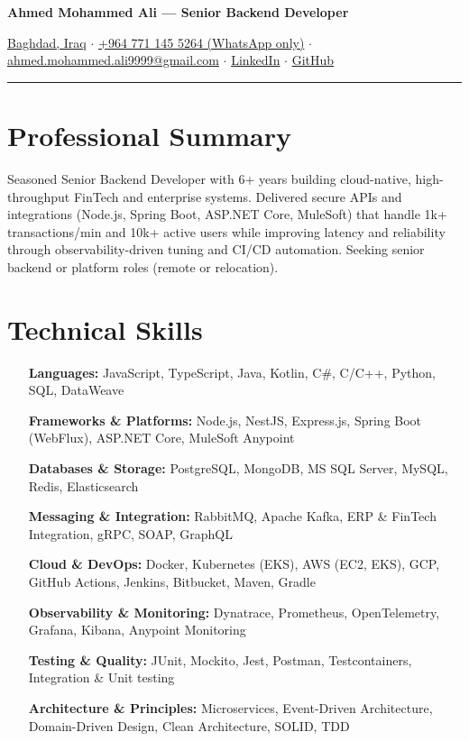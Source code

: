 \documentclass[10pt, a4paper]{article}
\begin{document}
\begin{center}
    \textbf{\Large Ahmed Mohammed Ali — Senior Backend Developer}
\end{center}

\vspace{-1.5mm}
\begin{center}
    \small
    \href{https://maps.app.goo.gl/YourLocation}{Baghdad, Iraq}
    $\cdot$ \href{https://wa.me/9647711455264}{+964 771 145 5264 (WhatsApp only)}
    $\cdot$ \href{mailto:ahmed.mohammed.ali9999@gmail.com}{ahmed.mohammed.ali9999@gmail.com}
    $\cdot$ \href{https://linkedin.com/in/deadboyccc}{LinkedIn}
    $\cdot$ \href{https://github.com/deadboyccc}{GitHub}
\end{center}
\hrule %

\section*{Professional Summary}
Seasoned Senior Backend Developer with 6+ years building cloud-native, high-throughput FinTech and enterprise systems. Delivered secure APIs and integrations (Node.js, Spring Boot, ASP.NET Core, MuleSoft) that handle 1k+ transactions/min and 10k+ active users while improving latency and reliability through observability-driven tuning and CI/CD automation. Seeking senior backend or platform roles (remote or relocation).

\section*{Technical Skills}
\begin{itemize}[labelwidth=\dimexpr\linewidth--\itemindent\relax, leftmargin=0pt, itemindent=0em, labelsep=5pt, align=left]
    \item[\textbf{Languages:}] JavaScript, TypeScript, Java, Kotlin, C\#, C/C++, Python, SQL, DataWeave
    \item[\textbf{Frameworks \& Platforms:}] Node.js, NestJS, Express.js, Spring Boot (WebFlux), ASP.NET Core, MuleSoft Anypoint
    \item[\textbf{Databases \& Storage:}] PostgreSQL, MongoDB, MS SQL Server, MySQL, Redis, Elasticsearch
    \item[\textbf{Messaging \& Integration:}] RabbitMQ, Apache Kafka, ERP \& FinTech Integration, gRPC, SOAP, GraphQL
    \item[\textbf{Cloud \& DevOps:}] Docker, Kubernetes (EKS), AWS (EC2, EKS), GCP, GitHub Actions, Jenkins, Bitbucket, Maven, Gradle
    \item[\textbf{Observability \& Monitoring:}] Dynatrace, Prometheus, OpenTelemetry, Grafana, Kibana, Anypoint Monitoring
    \item[\textbf{Testing \& Quality:}] JUnit, Mockito, Jest, Postman, Testcontainers, Integration \& Unit testing
    \item[\textbf{Architecture \& Principles:}] Microservices, Event-Driven Architecture, Domain-Driven Design, Clean Architecture, SOLID, TDD
\end{itemize}
\end{document}
